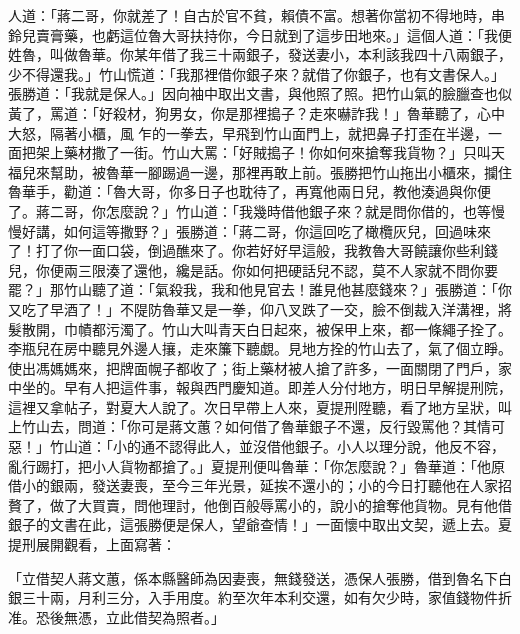 人道：「蔣二哥，你就差了！自古於官不貧，賴債不富。想著你當初不得地時，串鈴兒賣膏藥，也虧這位魯大哥扶持你，今日就到了這步田地來。」這個人道：「我便姓魯，叫做魯華。你某年借了我三十兩銀子，發送妻小，本利該我四十八兩銀子，少不得還我。」竹山慌道：「我那裡借你銀子來？就借了你銀子，也有文書保人。」張勝道：「我就是保人。」因向袖中取出文書，與他照了照。把竹山氣的臉臘查也似黃了，罵道：「好殺材，狗男女，你是那裡搗子？走來嚇詐我！」魯華聽了，心中大怒，隔著小櫃，風乍的一拳去，早飛到竹山面門上，就把鼻子打歪在半邊，一面把架上藥材撒了一街。竹山大罵：「好賊搗子！你如何來搶奪我貨物？」只叫天福兒來幫助，被魯華一腳踢過一邊，那裡再敢上前。張勝把竹山拖出小櫃來，攔住魯華手，勸道：「魯大哥，你多日子也耽待了，再寬他兩日兒，教他湊過與你便了。蔣二哥，你怎麼說？」竹山道：「我幾時借他銀子來？就是問你借的，也等慢慢好講，如何這等撒野？」張勝道：「蔣二哥，你這回吃了橄欖灰兒，回過味來了！打了你一面口袋，倒過醮來了。你若好好早這般，我教魯大哥饒讓你些利錢兒，你便兩三限湊了還他，纔是話。你如何把硬話兒不認，莫不人家就不問你要罷？」那竹山聽了道：「氣殺我，我和他見官去！誰見他甚麼錢來？」張勝道：「你又吃了早酒了！」不隄防魯華又是一拳，仰八叉跌了一交，臉不倒裁入洋溝裡，將髮散開，巾幘都污濁了。竹山大叫青天白日起來，被保甲上來，都一條繩子拴了。李瓶兒在房中聽見外邊人攘，走來簾下聽覷。見地方拴的竹山去了，氣了個立睜。使出馮媽媽來，把牌面幌子都收了；街上藥材被人搶了許多，一面關閉了門戶，家中坐的。早有人把這件事，報與西門慶知道。即差人分付地方，明日早解提刑院，這裡又拿帖子，對夏大人說了。次日早帶上人來，夏提刑陞聽，看了地方呈狀，叫上竹山去，問道：「你可是蔣文蕙？如何借了魯華銀子不還，反行毀罵他？其情可惡！」竹山道：「小的通不認得此人，並沒借他銀子。小人以理分說，他反不容，亂行踢打，把小人貨物都搶了。」夏提刑便叫魯華：「你怎麼說？」魯華道：「他原借小的銀兩，發送妻喪，至今三年光景，延挨不還小的；小的今日打聽他在人家招贅了，做了大買賣，問他理討，他倒百般辱罵小的，說小的搶奪他貨物。見有他借銀子的文書在此，這張勝便是保人，望爺查情！」一面懷中取出文契，遞上去。夏提刑展開觀看，上面寫著：

「立借契人蔣文蕙，係本縣醫師為因妻喪，無錢發送，憑保人張勝，借到魯名下白銀三十兩，月利三分，入手用度。約至次年本利交還，如有欠少時，家值錢物件折准。恐後無憑，立此借契為照者。」

